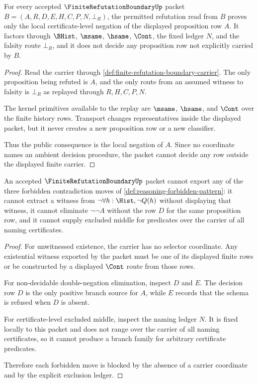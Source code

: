 \begin{theorem}
\label{thm:finite-refutation-boundary-ground-loop-soundness}
For every accepted $\FiniteRefutationBoundaryUp$ packet $B=(A,R,D,E,H,C,P,N,\bot_R)$, the permitted refutation read from $B$ proves only the local certificate-level negation of the displayed proposition row $A$. It factors through $\BHist$, $\msame$, $\hsame$, $\Cont$, the fixed ledger $N$, and the falsity route $\bot_R$, and it does not decide any proposition row not explicitly carried by $B$.
\end{theorem}
\begin{proof}
Read the carrier through \autoref{def:finite-refutation-boundary-carrier}. The only proposition being refuted is $A$, and the only route from an assumed witness to falsity is $\bot_R$ as replayed through $R,H,C,P,N$.

The kernel primitives available to the replay are $\msame$, $\hsame$, and $\Cont$ over the finite history rows. Transport changes representatives inside the displayed packet, but it never creates a new proposition row or a new classifier.

Thus the public consequence is the local negation of $A$. Since no coordinate names an ambient decision procedure, the packet cannot decide any row outside the displayed finite carrier.
\end{proof}

\begin{theorem}
\label{thm:finite-refutation-boundary-meta-escape-exclusion}
An accepted $\FiniteRefutationBoundaryUp$ packet cannot export any of the three forbidden contradiction moves of \autoref{def:reasoning-forbidden-pattern}: it cannot extract a witness from $\neg\forall h:\Hist,\neg Q(h)$ without displaying that witness, it cannot eliminate $\neg\neg A$ without the row $D$ for the same proposition row, and it cannot supply excluded middle for predicates over the carrier of all naming certificates.
\end{theorem}
\begin{proof}
For unwitnessed existence, the carrier has no selector coordinate. Any existential witness exported by the packet must be one of its displayed finite rows or be constructed by a displayed $\Cont$ route from those rows.

For non-decidable double-negation elimination, inspect $D$ and $E$. The decision row $D$ is the only positive branch source for $A$, while $E$ records that the schema is refused when $D$ is absent.

For certificate-level excluded middle, inspect the naming ledger $N$. It is fixed locally to this packet and does not range over the carrier of all naming certificates, so it cannot produce a branch family for arbitrary certificate predicates.

Therefore each forbidden move is blocked by the absence of a carrier coordinate and by the explicit exclusion ledger.
\end{proof}


